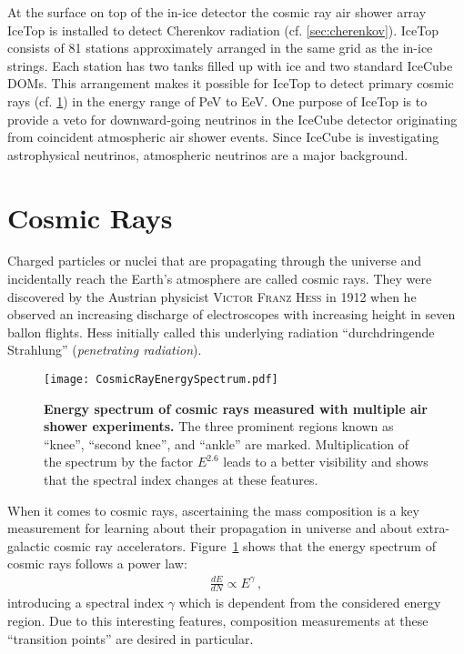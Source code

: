 At the surface on top of the in-ice detector the cosmic ray air shower array IceTop is installed to detect Cherenkov radiation (cf. \ref{sec:cherenkov}). IceTop consists of 81 stations approximately arranged in the same grid as the in-ice strings. Each station has two tanks filled up with ice and two standard IceCube DOMs. This arrangement makes it possible for IceTop to detect primary cosmic rays (cf. \ref{sec:cosmicrays}) in the energy range of \si{\peta\electronvolt} to \si{\exa\electronvolt}. One purpose of IceTop is to provide a veto for downward-going neutrinos in the IceCube detector originating from coincident atmospheric air shower events. \cite{icecube:instrumentation} Since IceCube is investigating astrophysical neutrinos, atmospheric neutrinos are a major background.



\section{Cosmic Rays}\label{sec:cosmicrays}

Charged particles or nuclei that are propagating through the universe and incidentally reach the Earth's atmosphere are called cosmic rays. They were discovered by the Austrian physicist \textsc{Victor Franz Hess} in 1912 when he observed an increasing discharge of electroscopes with increasing height in seven ballon flights. \cite{cosmicrays:hess} Hess initially called this underlying radiation \enquote{durchdringende Strahlung} (\textit{penetrating radiation}).

\begin{figure}[h]
	\texttt{[image: CosmicRayEnergySpectrum.pdf]}
	\caption[Cosmic ray energy spectrum]{\textbf{Energy spectrum of cosmic rays measured with multiple air shower experiments.} \cite[adapted]{cosmicrays:gaisser} The three prominent regions known as \enquote{knee}, \enquote{second knee}, and \enquote{ankle} are marked. Multiplication of the spectrum by the factor $E^{2.6}$ leads to a better visibility and shows that the spectral index changes at these features.}
	\label{cosmicrays:spectrum}	
\end{figure}

When it comes to cosmic rays, ascertaining the mass composition is a key measurement for learning about their propagation in universe and about extra-galactic cosmic ray accelerators. Figure~\ref{cosmicrays:spectrum} shows that the energy spectrum of cosmic rays follows a power law:
\begin{align}
\frac{dE}{dN}\propto E^\gamma\,,
\end{align}
introducing a spectral index $\gamma$ which is dependent from the considered energy region.
Due to this interesting features, composition measurements at these \enquote{transition points} are desired in particular.

